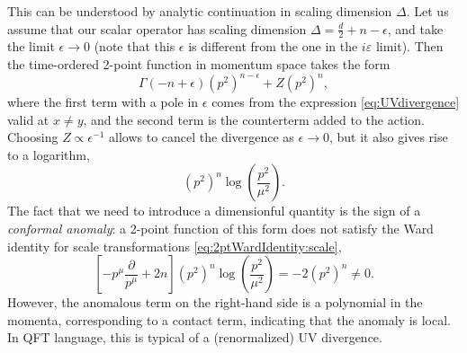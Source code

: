 \documentclass[a4paper,12pt]{article}
\numberwithin{equation}{section}
\begin{document}
This can be understood by analytic continuation in scaling dimension $\Delta$. Let us assume that our scalar operator has scaling dimension $\Delta = \frac{d}{2} + n - \epsilon$, and take the limit $\epsilon \to 0$ (note that this $\epsilon$ is different from the one in the $i \varepsilon$ limit). Then the time-ordered 2-point function in momentum space takes the form
\begin{equation}
	\Gamma(-n + \epsilon) (p^2)^{n - \epsilon}
	+ Z (p^2)^n,
\end{equation}
where the first term with a pole in $\epsilon$ comes from the expression \eqref{eq:UVdivergence} valid at $x \neq y$, and the second term is the counterterm added to the action.
Choosing $Z \propto \epsilon^{-1}$ allows to cancel the divergence as $\epsilon \to 0$, but it also gives rise to a logarithm, 
\begin{equation}
	(p^2)^n \log\left( \frac{p^2}{\mu^2} \right).
\end{equation}
The fact that we need to introduce a dimensionful quantity is the sign of a \emph{conformal anomaly}: a 2-point function of this form does not  satisfy the Ward identity for scale transformations \eqref{eq:2ptWardIdentity:scale},
\begin{equation}
	\left[ -p^\mu \frac{\partial}{p^\mu} + 2n \right]
	(p^2)^n \log\left( \frac{p^2}{\mu^2} \right)
	= -2 (p^2)^n \neq 0.
\end{equation}
However, the anomalous term on the right-hand side is a polynomial in the momenta, corresponding to a contact term, indicating that the anomaly is local. In QFT language, this is typical of a (renormalized) UV divergence.
\end{document}
